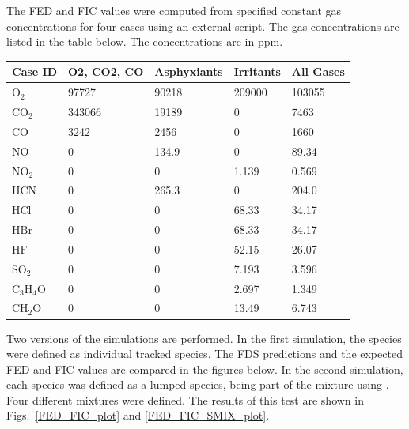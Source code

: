 \documentclass[11pt]{book}
\begin{document}
The FED and FIC values were computed from specified constant gas concentrations for four cases using an external script.
The gas concentrations are listed in the table below. The concentrations are in ppm.
\begin{center}
\begin{tabular}{|l|l|l|l|l|}
\hline Case ID & O2, CO2, CO & Asphyxiants & Irritants & All Gases \\ \hline \hline
$\mathrm{O_2}$ & 97727 & 90218 & 209000 & 103055 \\ \hline
$\mathrm{CO_2}$ & 343066 & 19189 & 0 & 7463 \\ \hline
$\mathrm{CO}$ & 3242 & 2456 & 0 & 1660 \\ \hline
$\mathrm{NO}$ & 0 & 134.9 & 0 & 89.34 \\ \hline
$\mathrm{NO_2}$ & 0 & 0 & 1.139 & 0.569 \\ \hline
$\mathrm{HCN}$ & 0 & 265.3 & 0 & 204.0 \\ \hline
$\mathrm{HCl}$ & 0 & 0 & 68.33 & 34.17 \\ \hline
$\mathrm{HBr}$ & 0 & 0 & 68.33 & 34.17 \\ \hline
$\mathrm{HF}$ & 0 & 0 & 52.15 & 26.07 \\ \hline
$\mathrm{SO_2}$ & 0 & 0 & 7.193 & 3.596 \\ \hline
$\mathrm{C_3H_4O}$ & 0 & 0 & 2.697 & 1.349 \\ \hline
$\mathrm{CH_2O}$ & 0 & 0 & 13.49 & 6.743  \\ \hline
\end{tabular}
\end{center}

Two versions of the simulations are performed. In the first simulation, the species were defined as individual tracked species.
The FDS predictions and the expected FED and FIC values are compared in the figures below. In the second simulation, each species was defined as
a lumped species, being part of the mixture using . Four different mixtures were defined. The results of this test are shown in
Figs.~\ref{FED_FIC_plot} and \ref{FED_FIC_SMIX_plot}.
\end{document}
